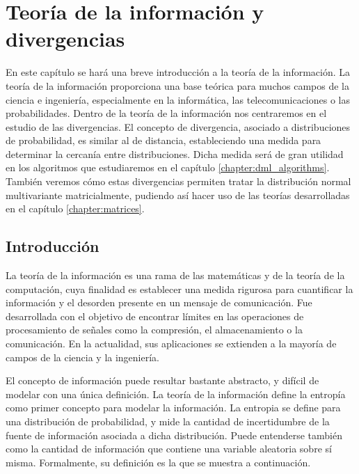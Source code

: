 \chapter{Teoría de la información y divergencias} \label{chapter:information_theory}

En este capítulo se hará una breve introducción a la teoría de la información. La teoría de la información proporciona una base teórica para muchos campos de la ciencia e ingeniería, especialmente en la informática, las telecomunicaciones o las probabilidades. Dentro de la teoría de la información nos centraremos en el estudio de las divergencias. El concepto de divergencia, asociado a distribuciones de probabilidad, es similar al de distancia, estableciendo una medida para determinar la cercanía entre distribuciones. Dicha medida será de gran utilidad en los algoritmos que estudiaremos en el capítulo \ref{chapter:dml_algorithms}. También veremos cómo estas divergencias permiten tratar la distribución normal multivariante matricialmente, pudiendo así hacer uso de las teorías desarrolladas en el capítulo \ref{chapter:matrices}.

\section{Introducción}

La teoría de la información es una rama de las matemáticas y de la teoría de la computación, cuya finalidad es establecer una medida rigurosa para cuantificar la información y el desorden presente en un mensaje de comunicación. Fue desarrollada con el objetivo de encontrar límites en las operaciones de procesamiento de señales como la compresión, el almacenamiento o la comunicación. En la actualidad, sus aplicaciones se extienden a la mayoría de campos de la ciencia y la ingeniería.

El concepto de información puede resultar bastante abstracto, y difícil de modelar con una única definición. La teoría de la información define la entropía como primer concepto para modelar la información. La entropia se define para una distribución de probabilidad, y mide la cantidad de incertidumbre de la fuente de información asociada a dicha distribución. Puede entenderse también como la cantidad de información que contiene una variable aleatoria sobre sí misma. Formalmente, su definición es la que se muestra a continuación.

